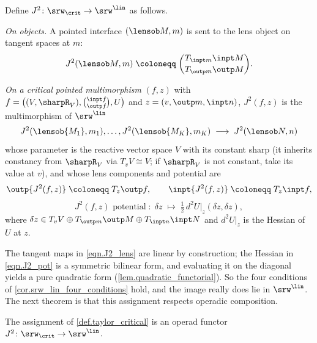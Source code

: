 \begin{definition}\label{def.taylor_critical}
Define $J^2\colon\srw_{\crit}\to\srw^{\lin}$ as follows.

\emph{On objects.} A pointed interface $(\lensob M,m)$ is sent to the lens object on tangent spaces at $m$:
\[
J^2(\lensob M,m)\;\coloneqq\;\binom{T_{\inpt m}\inpt M}{T_{\outp m}\outp M}.
\]

\emph{On a critical pointed multimorphism} $(f,z)$ with $f=\bigl((V,\sharpR_V),\binom{\inpt f}{\outp f},U\bigr)$ and $z=(v,\outp m,\inpt n)$, $J^2(f,z)$ is the multimorphism of $\srw^{\lin}$
\[
J^2(\lensob{M_1},m_1),\ldots,J^2(\lensob{M_K},m_K)\;\longrightarrow\;J^2(\lensob N,n)
\]
whose parameter is the reactive vector space $V$ with its constant sharp (it inherits constancy from $\sharpR_V$ via $T_vV\cong V$; if $\sharpR_V$ is not constant, take its value at $v$), and whose lens components and potential are
\begin{equation}\label{eqn.J2_lens}
\outp{J^2(f,z)}\;\coloneqq\;T_z\outp f,\qquad \inpt{J^2(f,z)}\;\coloneqq\;T_z\inpt f,
\end{equation}
\begin{equation}\label{eqn.J2_pot}
J^2(f,z)\text{ potential}\;\colon\;\delta z\;\longmapsto\;\tfrac12\,d^2U|_z(\delta z,\delta z),
\end{equation}
where $\delta z\in T_vV\oplus T_{\outp m}\outp M\oplus T_{\inpt n}\inpt N$ and $d^2U|_z$ is the Hessian of $U$ at $z$.
\end{definition}

The tangent maps in \eqref{eqn.J2_lens} are linear by construction; the Hessian in \eqref{eqn.J2_pot} is a symmetric bilinear form, and evaluating it on the diagonal yields a pure quadratic form (\cref{lem.quadratic_functorial}). So the four conditions of \cref{cor.srw_lin_four_conditions} hold, and the image really does lie in $\srw^{\lin}$. The next theorem is that this assignment respects operadic composition.

\begin{theorem}\label{thm.taylor_critical_functor}
The assignment of \cref{def.taylor_critical} is an operad functor $J^2\colon\srw_{\crit}\to\srw^{\lin}$.
\end{theorem}

